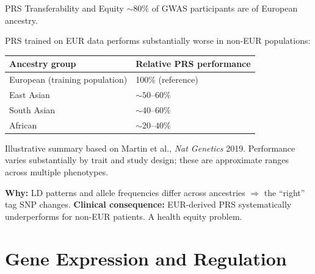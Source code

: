 \documentclass[aspectratio=169,10pt]{beamer}
\begin{document}
\begin{frame}{PRS Transferability and Equity}
${\sim}80\%$ of GWAS participants are of European ancestry.

\vspace{0.3em}
PRS trained on EUR data performs \alert{substantially worse} in non-EUR populations:

\vspace{0.2em}
\begin{center}
{\small
\begin{tabular}{ll}
\toprule
\textbf{Ancestry group} & \textbf{Relative PRS performance} \\
\midrule
European (training population) & 100\% (reference) \\
East Asian & ${\sim}50$--$60\%$ \\
South Asian & ${\sim}40$--$60\%$ \\
African & ${\sim}20$--$40\%$ \\
\bottomrule
\end{tabular}}
\end{center}
\vspace{-0.2em}
{\footnotesize Illustrative summary based on Martin et al., \textit{Nat Genetics} 2019. Performance varies substantially by trait and study design; these are approximate ranges across multiple phenotypes.}

\vspace{0.3em}
\textbf{Why:} LD patterns and allele frequencies differ across ancestries $\Rightarrow$ the ``right'' tag SNP changes. \textbf{Clinical consequence:} EUR-derived PRS systematically underperforms for non-EUR patients. A health equity problem.
\end{frame}


\section{Gene Expression and Regulation}
\end{document}
